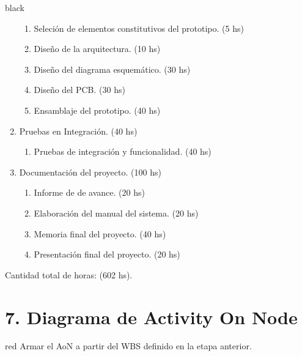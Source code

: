 \documentclass[11pt]{charter}
\begin{document}
\begin{consigna}{black}
\begin{enumerate}
    \begin{enumerate}
    	\item Seleción de elementos constitutivos del prototipo. \hfill(5 hs)
    	\item Diseño de la arquitectura. \hfill(10 hs)
    	\item Diseño del diagrama esquemático. \hfill(30 hs)
    	\item Diseño del PCB. \hfill(30 hs)
    	\item Ensamblaje del prototipo. \hfill(40 hs)
    \end{enumerate}
	\item Pruebas en Integración. \hfill(40 hs)
	\begin{enumerate}
		\item Pruebas de integración y funcionalidad. \hfill(40 hs)
	\end{enumerate}
	\item Documentación del proyecto. \hfill(100 hs)
	\begin{enumerate}
		\item Informe de de avance. \hfill(20 hs)
		\item Elaboración del manual del sistema. \hfill(20 hs)
		\item Memoria final del proyecto. \hfill(40 hs)
		\item Presentación final del proyecto. \hfill(20 hs)
	\end{enumerate}
    	
\end{enumerate}

Cantidad total de horas: (602 hs).

\end{consigna}

\section{7. Diagrama de Activity On Node}
\label{sec:AoN}

\begin{consigna}{red}
Armar el AoN a partir del WBS definido en la etapa anterior. 



\end{consigna}
\end{document}
